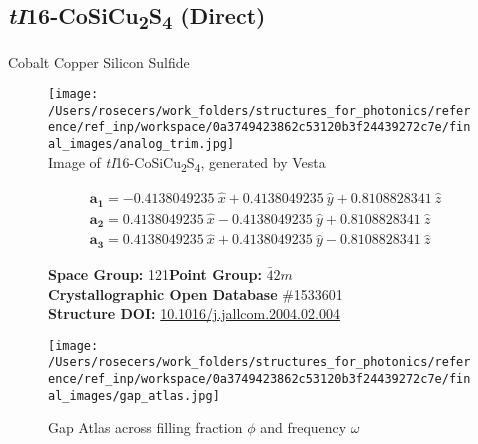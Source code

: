 \subsection{\large{\textit{tI}16-CoSiCu\textsubscript{2}S\textsubscript{4} (Direct)}}\vspace{-0.1in}
Cobalt Copper Silicon Sulfide


\begin{figure}[H]
\begin{minipage}{0.34\textwidth}\centering
\texttt{[image: /Users/rosecers/work\_folders/structures\_for\_photonics/reference/ref\_inp/workspace/0a3749423862c53120b3f24439272c7e/final\_images/analog\_trim.jpg]}\\
\small{Image of \textit{tI}16-CoSiCu\textsubscript{2}S\textsubscript{4}, generated by Vesta}
\end{minipage}\hfill
\begin{minipage}{0.65\textwidth}\raggedright
{\setlength{\mathindent}{0cm}
\begin{equation*}
\begin{split}&\boldsymbol{a_1} = -0.4138049235\ \hat{x} + 0.4138049235\ \hat{y} + 0.8108828341\ \hat{z}\\[-8pt]
&\boldsymbol{a_2} = 0.4138049235\ \hat{x} - 0.4138049235\ \hat{y} + 0.8108828341\ \hat{z}\\[-8pt]
&\boldsymbol{a_3} = 0.4138049235\ \hat{x} + 0.4138049235\ \hat{y} - 0.8108828341\ \hat{z}
\end{split}
\end{equation*}}

\textbf{Space Group:}	121\hspace{0.5in}\textbf{Point Group:}	$\bar{4}2m$\\
\textbf{Crystallographic Open Database} \#1533601\\
\textbf{Structure DOI: }\url{10.1016/j.jallcom.2004.02.004}

\end{minipage}\hfill
\end{figure}
\vspace{-0.25in}


\begin{figure}[H]
\begin{minipage}{0.9\textwidth}\centering
\texttt{[image: /Users/rosecers/work\_folders/structures\_for\_photonics/reference/ref\_inp/workspace/0a3749423862c53120b3f24439272c7e/final\_images/gap\_atlas.jpg]}
\\
\end{minipage}\hfill\caption{Gap Atlas across filling fraction $\phi$ and frequency $\omega$}
\end{figure}



